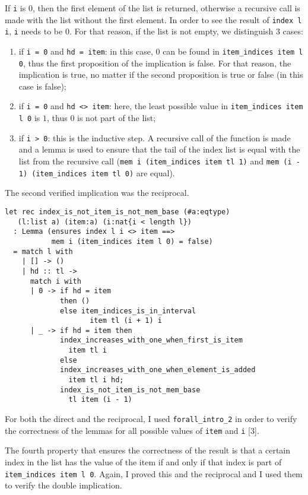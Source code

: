 If \texttt{i} is \(0\), then the first element of the list is returned, otherwise a recursive call is made with the list without the first element. In order to see the result of \texttt{index l i}, \texttt{i} needs to be \(0\). For that reason, if the list is not empty, we distinguish \(3\) cases: 
\begin{enumerate}
\item if \texttt{i = 0} and \texttt{hd = item}: in this case, \(0\) can be found in \texttt{item\_indices item l 0}, thus the first proposition of the implication is false. For that reason, the implication is true, no matter if the second proposition is true or false (in this case is false);
\item if \texttt{i = 0} and \texttt{hd <> item}: here, the least possible value in \texttt{item\_indices item l 0} is \(1\), thus \(0\) is not part of the list;
\item if \texttt{i > 0}: this is the inductive step. A recursive call of the function is made and a lemma is used to ensure that the tail of the index list is equal with the list from the recursive call (\texttt{mem i (item\_indices item tl 1)} and \texttt{mem (i - 1) (item\_indices item tl 0)} are equal).
\end{enumerate}

The second verified implication was the reciprocal. 

\begin{verbatim}
let rec index_is_not_item_is_not_mem_base (#a:eqtype) 
   (l:list a) (item:a) (i:nat{i < length l})
  : Lemma (ensures index l i <> item ==>
           mem i (item_indices item l 0) = false)
  = match l with 
    | [] -> ()
    | hd :: tl -> 
      match i with 
      | 0 -> if hd = item 
             then ()
             else item_indices_is_in_interval
                    item tl (i + 1) i
      | _ -> if hd = item then
             index_increases_with_one_when_first_is_item
               item tl i
             else
             index_increases_with_one_when_element_is_added
               item tl i hd;
             index_is_not_item_is_not_mem_base 
               tl item (i - 1)
\end{verbatim}

For both the direct and the reciprocal, I used \texttt{forall\_intro\_2} in order to verify the correctness of the lemmas for all possible values of \texttt{item} and \texttt{i} [\(3\)].

The fourth property that ensures the correctness of the result is that a certain index in the list has the value of the item if and only if that index is part of \texttt{item\_indices item l 0}. Again, I proved this and the reciprocal and I used them to verify the double implication.


